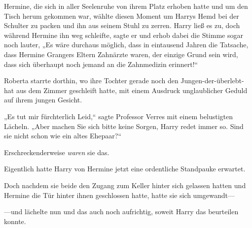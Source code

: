 Hermine, die sich in aller Seelenruhe von ihrem Platz erhoben hatte und um den Tisch herum gekommen war, wählte diesen Moment um Harrys Hemd bei der Schulter zu packen und ihn aus seinem Stuhl zu zerren. Harry ließ es zu, doch während Hermine ihn weg schleifte, sagte er und erhob dabei die Stimme sogar noch lauter, „Es wäre durchaus möglich, dass in eintausend Jahren die Tatsache, dass Hermine Grangers Eltern Zahnärzte waren, der einzige Grund sein wird, dass sich überhaupt noch jemand an die Zahnmedizin erinnert!“

\later

Roberta starrte dorthin, wo ihre Tochter gerade noch den Jungen-der-überlebt-hat aus dem Zimmer geschleift hatte, mit einem Ausdruck unglaublicher Geduld auf ihrem jungen Gesicht.

„Es tut mir fürchterlich Leid,“ sagte Professor Verres mit einem belustigten Lächeln. „Aber machen Sie sich bitte keine Sorgen, Harry redet immer so. Sind sie nicht schon wie ein altes Ehepaar?“

Erschreckenderweise \emph{waren} sie das.

\later

Eigentlich hatte Harry von Hermine jetzt eine ordentliche Standpauke erwartet.

Doch nachdem sie beide den Zugang zum Keller hinter sich gelassen hatten und Hermine die Tür hinter ihnen geschlossen hatte, hatte sie sich umgewandt—

—und lächelte nun und das auch noch aufrichtig, soweit Harry das beurteilen konnte.


